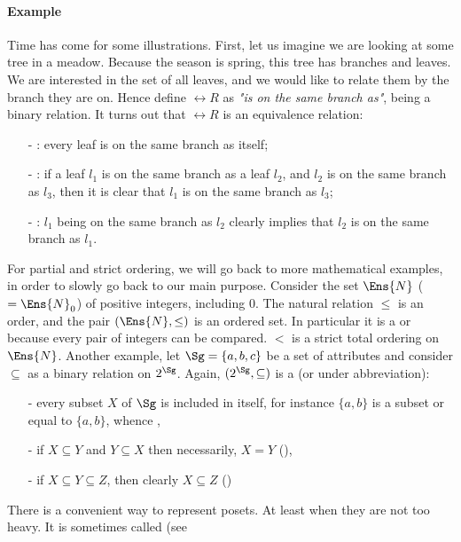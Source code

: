 \paragraph{Example} Time has come for some illustrations. First, let us imagine
we are looking at some tree in a meadow. Because the season is spring, this tree
has branches and leaves. We are interested in the set of all leaves, and we 
would like to relate them by the branch they are on. Hence define $\rel{R}$ as
\textit{"is on the same branch as"}, being a binary relation. It turns out
that $\rel{R}$ is an equivalence relation:
\begin{itemize}
	\item[-] : every leaf is on the same branch as itself;
	\item[-] : if a leaf $l_1$ is on the same branch as
	a leaf $l_2$, and $l_2$ is on the same branch as $l_3$, then it is clear
	that $l_1$ is on the same branch as $l_3$;
	\item[-] : $l_1$ being on the same branch as $l_2$ clearly
	implies that $l_2$ is on the same branch as $l_1$.
\end{itemize}
\noindent For partial and strict ordering, we will go back to more mathematical
examples, in order to slowly go back to our main purpose. Consider the set 
$\Ens{N}$ ($= \Ens{N}_0 $) of positive integers, including 0. The natural 
relation $\leq$ is an order, and the pair $(\Ens{N}, \leq)$ is an ordered set.
In particular it is a  or  because 
every pair of integers can be compared. $<$ is a strict total ordering on 
$\Ens{N}$. Another example, let $\Sg = \{a, b, c \}$ be a set of attributes and
consider $\subseteq$ as a binary relation on $2^{\Sg}$. Again, $(2^{\Sg}, 
\subseteq)$ is a  (or  under 
abbreviation):
\begin{itemize}
	\item[-] every subset $X$ of $\Sg$ is included in itself, for instance 
	$\{a, b\}$ is a subset or equal to $\{a, b\}$, whence ,
	\item[-] if $X \subseteq Y$ and $Y \subseteq X$ then necessarily, $X = Y$
	(),
	\item[-] if $X \subseteq Y \subseteq Z$, then clearly $X \subseteq Z$
	()
\end{itemize}
\noindent There is a convenient way to represent posets. At least when they are
not too heavy. It is sometimes called  (see 
